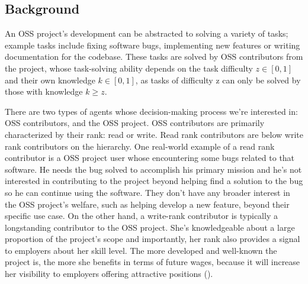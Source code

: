\documentclass[../main.tex]{subfiles}
\begin{document}
\subsection{Background}
An OSS project's development can be abstracted to solving a variety of tasks; example tasks include fixing software bugs, implementing new features or writing documentation for the codebase. These tasks are solved by OSS contributors from the project, whose task-solving ability depends on the task difficulty $z \in [0, 1]$ and their own knowledge $k \in [0, 1]$, as tasks of difficulty z can only be solved by those with knowledge $k \geq z$. 

\qquad There are two types of agents whose decision-making process we're interested in: OSS contributors, and the OSS project. OSS contributors are primarily characterized by their rank: read or write. Read rank contributors are below write rank contributors on the hierarchy.  One real-world example of a read rank contributor is a OSS project user whose encountering some bugs related to that software. He needs the bug solved to accomplish his primary mission and he's not interested in contributing to the project beyond helping find a solution to the bug so he can continue using the software. They don't have any broader interest in the OSS project's welfare, such as helping develop a new feature, beyond their specific use case. On the other hand, a write-rank contributor is typically a longstanding contributor to the OSS project. She's knowledgeable about a large proportion of the project's scope and importantly, her rank also provides a signal to employers about her skill level. The more developed and well-known the project is, the more she benefits in terms of future wages, because it will increase her visibility to employers offering attractive positions (\cite{hann_economic_2002}). 
\end{document}
